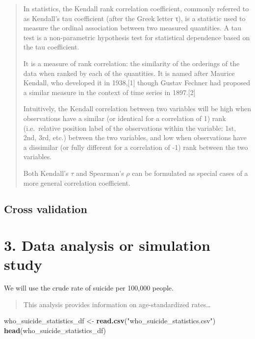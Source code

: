 \documentclass[]{article}
\newenvironment{Shaded}{\begin{snugshade}}{\end{snugshade}}
\newcommand{\KeywordTok}[1]{\textcolor[rgb]{0.13,0.29,0.53}{\textbf{#1}}}
\newcommand{\NormalTok}[1]{#1}
\newcommand{\StringTok}[1]{\textcolor[rgb]{0.31,0.60,0.02}{#1}}
\begin{document}
\begin{quote}
In statistics, the Kendall rank correlation coefficient, commonly
referred to as Kendall's tau coefficient (after the Greek letter τ), is
a statistic used to measure the ordinal association between two measured
quantities. A tau test is a non-parametric hypothesis test for
statistical dependence based on the tau coefficient.

It is a measure of rank correlation: the similarity of the orderings of
the data when ranked by each of the quantities. It is named after
Maurice Kendall, who developed it in 1938,{[}1{]} though Gustav Fechner
had proposed a similar measure in the context of time series in
1897.{[}2{]}

Intuitively, the Kendall correlation between two variables will be high
when observations have a similar (or identical for a correlation of 1)
rank (i.e.~relative position label of the observations within the
variable: 1st, 2nd, 3rd, etc.) between the two variables, and low when
observations have a dissimilar (or fully different for a correlation of
-1) rank between the two variables.

Both Kendall's \(\tau\) and Spearman's \(\rho\) can be formulated as
special cases of a more general correlation coefficient.
\end{quote}

\hypertarget{cross-validation}{%
\subsection{Cross validation}\label{cross-validation}}

\hypertarget{data-analysis-or-simulation-study}{%
\section{3. Data analysis or simulation
study}\label{data-analysis-or-simulation-study}}

We will use the crude rate of suicide per 100,000 people.

\begin{quote}
This analysis provides information on age-standardized rates\ldots{}
\end{quote}

\begin{Shaded}
\begin{Highlighting}[]
\NormalTok{who_suicide_statistics_df <-}\StringTok{ }\KeywordTok{read.csv}\NormalTok{(}\StringTok{"who_suicide_statistics.csv"}\NormalTok{)}
\KeywordTok{head}\NormalTok{(who_suicide_statistics_df)}
\end{Highlighting}
\end{Shaded}
\end{document}
